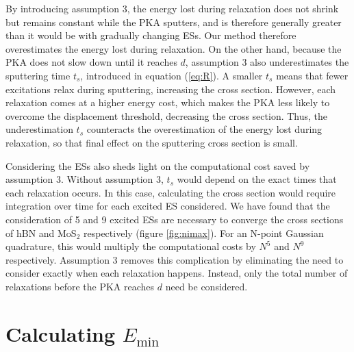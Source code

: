 \documentclass{article}
\begin{document}
By introducing assumption 3, the energy lost during relaxation does not
shrink but remains constant while the PKA sputters, and is therefore generally
greater than it would be with gradually changing ESs.
Our method therefore overestimates the energy lost during relaxation.
On the other hand, because the PKA does not slow down until it reaches $d$,
assumption 3 also underestimates the sputtering time $t_s$, introduced in
equation (\ref{eq:R}).
A smaller $t_s$ means that fewer excitations relax during sputtering,
increasing the cross section.
However, each relaxation comes at a higher energy cost, which makes the PKA
less likely to overcome the displacement threshold, decreasing the cross
section.
Thus, the underestimation $t_s$ counteracts the overestimation of the energy
lost during relaxation, so that final effect on the sputtering cross section is
small.

Considering the ESs also sheds light on the computational cost saved by
assumption 3.
Without assumption 3, $t_s$ would depend on the exact times that each
relaxation occurs.
In this case, calculating the cross section would require integration over time
for each excited ES considered.
We have found that the consideration of 5 and 9 excited ESs are necessary to
converge the cross sections of hBN and MoS$_2$ respectively (figure
\ref{fig:nimax}).
For an N-point Gaussian quadrature, this would multiply the computational costs
by $N^5$ and $N^9$ respectively.
Assumption 3 removes this complication by eliminating the need to consider
exactly when each relaxation happens.
Instead, only the total number of relaxations before the PKA reaches $d$ need
be considered.

\pagebreak
\section{Calculating $E_\text{min}$}
\label{app:Emin}
\end{document}
